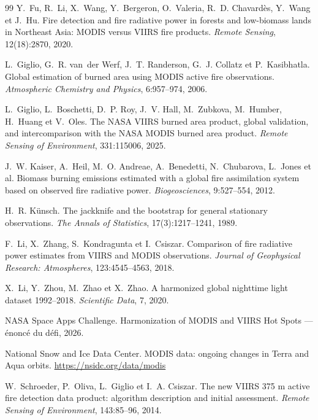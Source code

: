 \documentclass[11pt,a4paper]{article}
\begin{document}
\begin{thebibliography}{99}
Y.~Fu, R.~Li, X.~Wang, Y.~Bergeron, O.~Valeria, R.~D. Chavardès, Y.~Wang et J.~Hu.
\newblock Fire detection and fire radiative power in forests and low-biomass lands in Northeast Asia: MODIS versus VIIRS fire products.
\newblock \emph{Remote Sensing}, 12(18):2870, 2020.

L.~Giglio, G.~R. van~der Werf, J.~T. Randerson, G.~J. Collatz et P.~Kasibhatla.
\newblock Global estimation of burned area using MODIS active fire observations.
\newblock \emph{Atmospheric Chemistry and Physics}, 6:957--974, 2006.

L.~Giglio, L.~Boschetti, D.~P. Roy, J.~V. Hall, M.~Zubkova, M.~Humber, H.~Huang et V.~Oles.
\newblock The NASA VIIRS burned area product, global validation, and intercomparison with the NASA MODIS burned area product.
\newblock \emph{Remote Sensing of Environment}, 331:115006, 2025.

J.~W. Kaiser, A.~Heil, M.~O. Andreae, A.~Benedetti, N.~Chubarova, L.~Jones et al.
\newblock Biomass burning emissions estimated with a global fire assimilation system based on observed fire radiative power.
\newblock \emph{Biogeosciences}, 9:527--554, 2012.

H.~R. Künsch.
\newblock The jackknife and the bootstrap for general stationary observations.
\newblock \emph{The Annals of Statistics}, 17(3):1217--1241, 1989.

F.~Li, X.~Zhang, S.~Kondragunta et I.~Csiszar.
\newblock Comparison of fire radiative power estimates from VIIRS and MODIS observations.
\newblock \emph{Journal of Geophysical Research: Atmospheres}, 123:4545--4563, 2018.

X.~Li, Y.~Zhou, M.~Zhao et X.~Zhao.
\newblock A harmonized global nighttime light dataset 1992--2018.
\newblock \emph{Scientific Data}, 7, 2020.

NASA Space Apps Challenge.
\newblock Harmonization of MODIS and VIIRS Hot Spots --- énoncé du défi, 2026.

National Snow and Ice Data Center.
\newblock MODIS data: ongoing changes in Terra and Aqua orbits.
\newblock \url{https://nsidc.org/data/modis}

W.~Schroeder, P.~Oliva, L.~Giglio et I.~A. Csiszar.
\newblock The new VIIRS 375 m active fire detection data product: algorithm description and initial assessment.
\newblock \emph{Remote Sensing of Environment}, 143:85--96, 2014.


\end{thebibliography}
\end{document}
